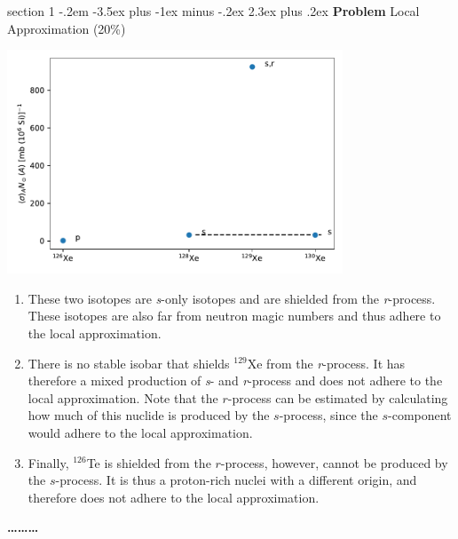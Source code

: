 \documentclass[letterpaper,12pt,twoside=false,DIV=11]{scrartcl}
\makeatletter
\newenvironment{problem}{\@startsection
    {section}
    {1}
    {-.2em}
    {-3.5ex plus -1ex minus -.2ex}
    {2.3ex plus .2ex}
    {
        \pagebreak[3] %
        \noindent\sffamily\bfseries Problem
    }
}
{
    \begin{center}\large\bfseries\ldots\ldots\ldots\end{center}
}
\providecommand{\ex}[1]{\ensuremath{^{#1}}}
\makeatother
\begin{document}
\begin{problem}{Local Approximation (20\%)}
\begin{center}
    \includegraphics[width=0.75\textwidth]{local_approx_xe}
\end{center}
\begin{enumerate}
    \item These two isotopes are \emph{s}-only isotopes and are shielded from the \textit{r}-process. These isotopes are also far from neutron magic numbers and thus adhere to the local approximation.
    \item There is no stable isobar that shields \ex{129}Xe from the \textit{r}-process. It has therefore a mixed production of \textit{s}- and \textit{r}-process and does not adhere to the local approximation. Note that the $r$-process can be estimated by calculating how much of this nuclide is produced by the $s$-process, since the $s$-component would adhere to the local approximation.
    \item Finally, \ex{126}Te is shielded from the $r$-process, however, cannot be produced by the $s$-process. It is thus a proton-rich nuclei with a different origin, and therefore does not adhere to the local approximation.
\end{enumerate}
\end{problem}
\end{document}

